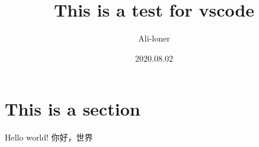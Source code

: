 \documentclass[a4paper]{article}
\title{\heiti\zihao{2} This is a test for vscode} %
\author{\songti Ali-loner} %
\date{2020.08.02} %
\begin{document}
    \maketitle %
\begin{abstract} %
    \lipsum[2] %
\end{abstract}
\tableofcontents %
\section{This is a section}
Hello world! 你好，世界 
\end{document}
